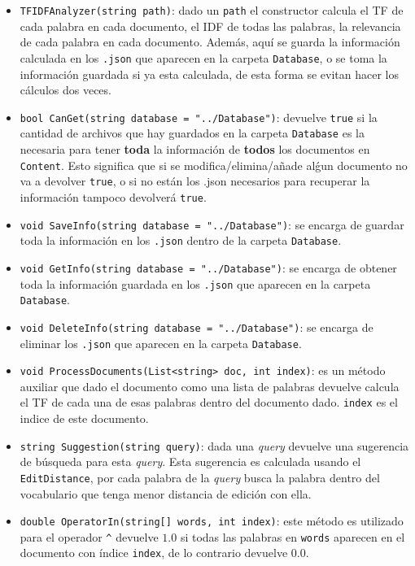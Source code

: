 \documentclass[a4paper, 12pt]{report}
\begin{document}
\begin{itemize}
	\item {\tt TFIDFAnalyzer(string path)}: dado un {\tt path} el constructor calcula el TF
	      de cada palabra en cada documento, el IDF de todas las palabras, la relevancia de cada
	      palabra en cada documento. Adem\'as, aqu\'i se guarda la informaci\'on calculada en los
		      {\tt .json} que aparecen en la carpeta {\tt Database}, o se toma la informaci\'on guardada
	      si ya esta calculada, de esta forma se evitan hacer los c\'alculos dos veces.
	\item {\tt bool CanGet(string database = "../Database")}: devuelve {\tt true} si la cantidad
	      de archivos que hay guardados en la carpeta {\tt Database} es la necesaria para tener {\bf toda}
	      la informaci\'on de {\bf todos} los documentos en {\tt Content}. Esto significa que si se modifica/elimina/a\~nade
	      al\'gun documento no va a devolver {\tt true}, o si no est\'an los {.json} necesarios
	      para recuperar la informaci\'on tampoco devolver\'a {\tt true}.
	\item {\tt void SaveInfo(string database = "../Database")}: se encarga de guardar toda la informaci\'on en los {\tt .json} dentro de la carpeta {\tt Database}.
	\item {\tt void GetInfo(string database = "../Database")}: se encarga de obtener toda la informaci\'on guardada en los {\tt .json} que aparecen en la carpeta {\tt Database}.
	\item {\tt void DeleteInfo(string database = "../Database")}: se encarga de eliminar los {\tt .json} que aparecen en la carpeta {\tt Database}.
	\item {\tt void ProcessDocuments(List<string> doc, int index)}: es un m\'etodo auxiliar que dado el documento como una lista de palabras devuelve calcula el TF de cada una de esas
	      palabras dentro del documento dado. {\tt index} es el indice de este documento.
	\item {\tt string Suggestion(string query)}: dada una {\it query} devuelve una sugerencia de b\'usqueda para esta {\it query}. Esta sugerencia es calculada
	      usando el {\tt EditDistance}, por cada palabra de la {\it query} busca la palabra dentro del vocabulario que tenga menor distancia de edici\'on con ella.
	\item {\tt double OperatorIn(string[] words, int index)}: este m\'etodo es utilizado para el operador {\tt \^{}} devuelve $1.0$ si todas las palabras en {\tt words}
	      aparecen en el documento con \'indice {\tt index}, de lo contrario devuelve $0.0$.

\end{itemize}
\end{document}
